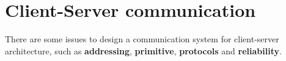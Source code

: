 \documentclass[11pt,a4paper]{article}
\begin{document}

\newcommand{\titolo}  {Afternotes}
\newcommand{\versione}{2.0}





\newpage



\newpage




\section{Client-Server communication}
There are some issues to design a communication system for client-server architecture, such as \textbf{addressing}, \textbf{primitive}, \textbf{protocols} and \textbf{reliability}.
\end{document}
